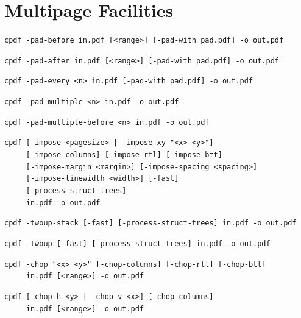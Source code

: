 \documentclass{book}
\begin{document}
\chapter{Multipage Facilities}\pagestyle{fancy}\label{multipage}\label{chap:9}
  \begin{framed}
    \small\noindent\verb!cpdf -pad-before in.pdf [<range>] [-pad-with pad.pdf] -o out.pdf!

    \vspace{1.5mm}
    \small\noindent\verb!cpdf -pad-after in.pdf [<range>] [-pad-with pad.pdf] -o out.pdf!

    \vspace{1.5mm}
    \small\noindent\verb!cpdf -pad-every <n> in.pdf [-pad-with pad.pdf] -o out.pdf!

    \vspace{1.5mm}
    \small\noindent\verb!cpdf -pad-multiple <n> in.pdf -o out.pdf!

    \vspace{1.5mm}
    \small\noindent\verb!cpdf -pad-multiple-before <n> in.pdf -o out.pdf!



    \vspace{1.5mm}
    \small\noindent\verb!cpdf [-impose <pagesize> | -impose-xy "<x> <y>"]!\\
    \small\noindent\verb!     [-impose-columns] [-impose-rtl] [-impose-btt]!\\
    \small\noindent\verb!     [-impose-margin <margin>] [-impose-spacing <spacing>]!\\
    \small\noindent\verb!     [-impose-linewidth <width>] [-fast]!\\
    \small\noindent\verb!     [-process-struct-trees]!\\
    \small\noindent\verb!     in.pdf -o out.pdf!

    \vspace{1.5mm}
    \small\noindent\verb!cpdf -twoup-stack [-fast] [-process-struct-trees] in.pdf -o out.pdf! 

    \vspace{1.5mm}
    \small\noindent\verb!cpdf -twoup [-fast] [-process-struct-trees] in.pdf -o out.pdf!

    \vspace{1.5mm}
    \small\noindent\verb!cpdf -chop "<x> <y>" [-chop-columns] [-chop-rtl] [-chop-btt]!\\
    \small\noindent\verb!     in.pdf [<range>] -o out.pdf!

    \vspace{1.5mm}
    \small\noindent\verb!cpdf [-chop-h <y> | -chop-v <x>] [-chop-columns]!\\
    \small\noindent\verb!     in.pdf [<range>] -o out.pdf!
  \end{framed}
\end{document}
